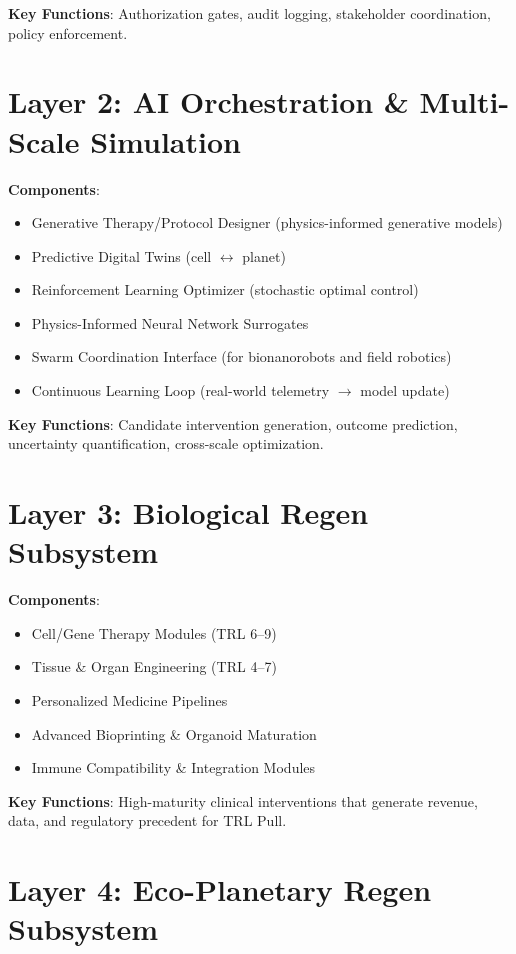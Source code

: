 \documentclass[11pt,a4paper]{report}
\begin{document}
\textbf{Key Functions}: Authorization gates, audit logging, stakeholder coordination, policy enforcement.

\section{Layer 2: AI Orchestration \& Multi-Scale Simulation}

\textbf{Components}:
\begin{itemize}
    \item Generative Therapy/Protocol Designer (physics-informed generative models)
    \item Predictive Digital Twins (cell $\leftrightarrow$ planet)
    \item Reinforcement Learning Optimizer (stochastic optimal control)
    \item Physics-Informed Neural Network Surrogates
    \item Swarm Coordination Interface (for bionanorobots and field robotics)
    \item Continuous Learning Loop (real-world telemetry $\to$ model update)
\end{itemize}

\textbf{Key Functions}: Candidate intervention generation, outcome prediction, uncertainty quantification, cross-scale optimization.

\section{Layer 3: Biological Regen Subsystem}

\textbf{Components}:
\begin{itemize}
    \item Cell/Gene Therapy Modules (TRL 6--9)
    \item Tissue \& Organ Engineering (TRL 4--7)
    \item Personalized Medicine Pipelines
    \item Advanced Bioprinting \& Organoid Maturation
    \item Immune Compatibility \& Integration Modules
\end{itemize}

\textbf{Key Functions}: High-maturity clinical interventions that generate revenue, data, and regulatory precedent for TRL Pull.

\section{Layer 4: Eco-Planetary Regen Subsystem}
\end{document}
